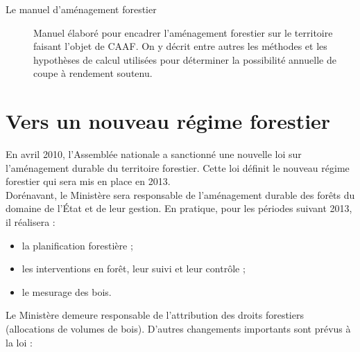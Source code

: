 \begin{description}
\item[Le manuel d'aménagement forestier]  Manuel élaboré pour encadrer l'aménagement forestier sur le territoire faisant l'objet de CAAF. On y décrit entre autres les méthodes et les hypothèses de calcul utilisées pour déterminer la possibilité annuelle de coupe à rendement soutenu.


\end{description}

\section{Vers un nouveau régime forestier}

En avril 2010, l'Assemblée nationale a sanctionné une nouvelle loi sur l'aménagement durable du territoire forestier. Cette loi définit le nouveau régime forestier qui sera mis en place en 2013.\\

Dorénavant, le Ministère sera responsable de l'aménagement durable des forêts du domaine de l'État et de leur gestion. En pratique, pour les périodes suivant 2013, il réalisera :

\begin{itemize}
\item la planification forestière ;
\item les interventions en forêt, leur suivi et leur contrôle ;
\item le mesurage des bois.
\end{itemize}

Le Ministère demeure responsable de l'attribution des droits forestiers (allocations de volumes de bois). D'autres changements importants sont prévus à la loi :

